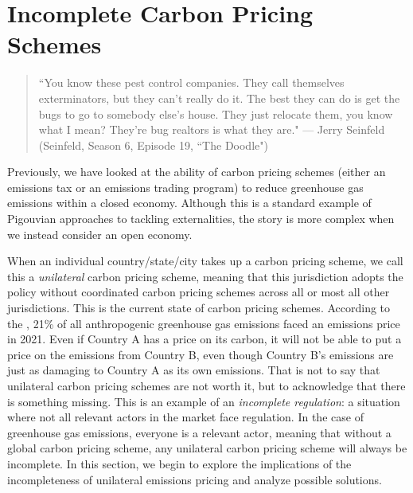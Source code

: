 \newpage
\section{Incomplete Carbon Pricing Schemes}

\begin{quote}
``You know these pest control companies. They call themselves exterminators, but they can't really do it. The best they can do is get the bugs to go to somebody else's house. They just relocate them, you know what I mean? They're bug realtors is what they are."
--- Jerry Seinfeld (Seinfeld, Season 6, Episode 19, ``The Doodle")
\end{quote}

Previously, we have looked at the ability of carbon pricing schemes (either an emissions tax or an emissions trading program) to reduce greenhouse gas emissions within a closed economy. Although this is a standard example of Pigouvian approaches to tackling externalities, the story is more complex when we instead consider an open economy. 

When an individual country/state/city takes up a carbon pricing scheme, we call this a \emph{unilateral} carbon pricing scheme, meaning that this jurisdiction adopts the policy without coordinated carbon pricing schemes across all or most all other jurisdictions. This is the current state of carbon pricing schemes. According to the \cite{wbank}, 21\% of all anthropogenic greenhouse gas emissions faced an emissions price in 2021. Even if Country A has a price on its carbon, it will not be able to put a price on the emissions from Country B, even though Country B's emissions are just as damaging to Country A as its own emissions. That is not to say that unilateral carbon pricing schemes are not worth it, but to acknowledge that there is something missing. This is an example of an \emph{incomplete regulation}: a situation where not all relevant actors in the market face regulation. In the case of greenhouse gas emissions, everyone is a relevant actor, meaning that without a global carbon pricing scheme, any unilateral carbon pricing scheme will always be incomplete. In this section, we begin to explore the implications of the incompleteness of unilateral emissions pricing and analyze possible solutions.


